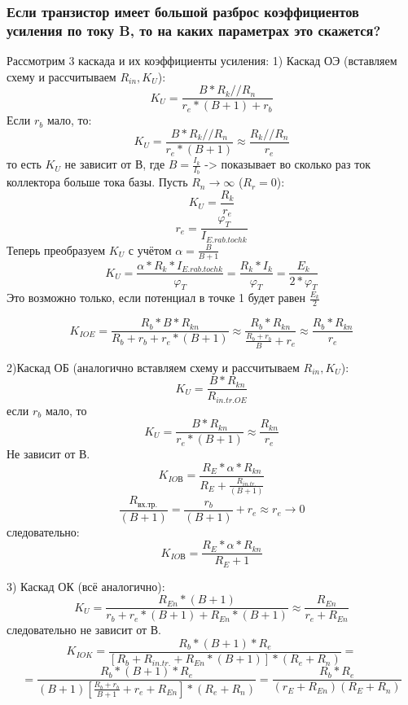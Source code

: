 \subsubsection{Если транзистор имеет большой разброс коэффициентов усиления по току B, то на каких параметрах это скажется?}

Рассмотрим 3 каскада и их коэффициенты усиления:
1) Каскад ОЭ (вставляем схему и рассчитываем $R_{in},K_{U}$):
$$
K_{U}=\frac{B*R_{k}//R_{n}}{r_{e}*(B+1)+r_{b}}
$$
Если $r_{b}$ мало, то:
$$
K_{U}=\frac{B*R_{k}//R_{n}}{r_{e}*(B+1)}\approx \frac{R_{k}//R_{n}}{r_{e}}
$$
то есть $K_{U}$ не зависит от В, где $B=\frac{I_{k}}{I_{b}}$ -> показывает во сколько раз ток коллектора больше тока базы.
Пусть $R_{n}\to\infty$ ($R_{r}=0$):
$$
K_{U}=\frac{R_{k}}{r_{e}}
$$
$$
r_{e}=\frac{\varphi_{T}}{I_{E.rab.tochk}}
$$
Теперь преобразуем $K_{U}$ с учётом $\alpha=\frac{B}{B+1}$
$$
K_{U}=\frac{\alpha*R_{k}*I_{E.rab.tochk}}{\varphi_{T}}=\frac{R_{k}*I_{k}}{\varphi_{T}}=\frac{E_{k}}{2*\varphi_{T}}
$$
Это возможно только, если потенциал в точке 1 будет равен $\frac{E_{k}}{2}$
\begin{center}
\begin{figure}[h!]
\end{figure}
\end{center}
$$
K_{IOE}=\frac{R_{b}*B*R_{kn}}{R_{b}+r_{b}+r_{e}*(B+1)}\approx \frac{R_{b}*R_{kn}}{\frac{R_{b}+r_{b}}{B}+r_{e}}\approx \frac{R_{b}*R_{kn}}{r_{e}}
$$

2)Каскад ОБ (аналогично вставляем схему и рассчитываем $R_{in},K_{U}$):
$$
K_{U}=\frac{B*R_{kn}}{R_{in.tr.OE}}
$$
если $r_{b}$ мало, то 
$$
K_{U}=\frac{B*R_{kn}}{r_{e}*(B+1)}\approx \frac{R_{kn}}{r_{e}}
$$
Не зависит от В.
$$
K_{IOВ}=\frac{R_{E}*\alpha*R_{kn}}{R_{E}+\frac{R_{in.tr.}}{(B+1)}}
$$
$$
\frac{R_{вх.тр.}}{(B+1)}=\frac{r_{b}}{(B+1)}+r_{e}\approx r_{e}\to 0
$$
следовательно:
$$
K_{IOВ}=\frac{R_{E}*\alpha*R_{kn}}{R_{E}+1}
$$

3) Каскад ОК (всё аналогично):
$$
K_{U}=\frac{R_{En}*(B+1)}{r_{b}+r_{e}*(B+1)+R_{En}*(B+1)}\approx \frac{R_{En}}{r_{e}+R_{En}}
$$
следовательно не зависит от В.
$$
K_{IOK}=\frac{R_{b}*(B+1)*R_{e}}{[R_{b}+R_{in.tr.}+R_{En}*(B+1)]*(R_{e}+R_{n})}=
$$
$$
=\frac{R_{b}*(B+1)*R_{e}}{(B+1)[\frac{R_{b}+r_{b}}{B+1}+r_{e}+R_{En}]*(R_{e}+R_{n})}=\frac{R_{b}*R_{e}}{(r_{E}+R_{En})(R_{E}+R_{n})}
$$
